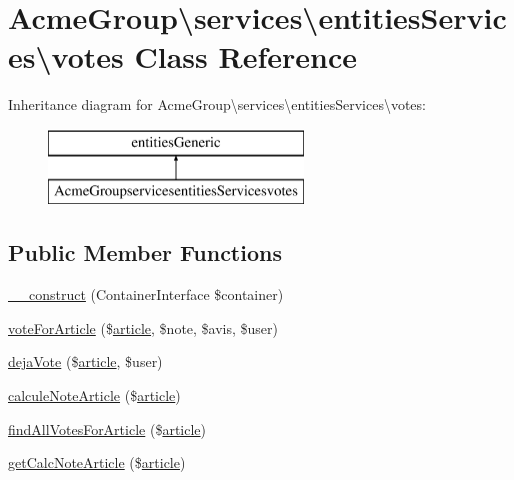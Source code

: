 \hypertarget{class_acme_group_1_1services_1_1entities_services_1_1votes}{\section{Acme\+Group\textbackslash{}services\textbackslash{}entities\+Services\textbackslash{}votes Class Reference}
\label{class_acme_group_1_1services_1_1entities_services_1_1votes}
}
Inheritance diagram for Acme\+Group\textbackslash{}services\textbackslash{}entities\+Services\textbackslash{}votes\+:\begin{figure}[H]
\begin{center}
\leavevmode
\includegraphics[height=2.000000cm]{class_acme_group_1_1services_1_1entities_services_1_1votes}
\end{center}
\end{figure}
\subsection*{Public Member Functions}
\begin{DoxyCompactItemize}
\item 
\hyperlink{class_acme_group_1_1services_1_1entities_services_1_1votes_af541f0aa42a9db3a5e1b8128765dedf6}{\+\_\+\+\_\+construct} (Container\+Interface \$container)
\item 
\hyperlink{class_acme_group_1_1services_1_1entities_services_1_1votes_a467e89e075a54283a7ab17bd38a63881}{vote\+For\+Article} (\$\hyperlink{class_acme_group_1_1_labo_bundle_1_1_entity_1_1article}{article}, \$note, \$avis, \$user)
\item 
\hyperlink{class_acme_group_1_1services_1_1entities_services_1_1votes_a23788787fd918ae002d89b3fcd9e23ea}{deja\+Vote} (\$\hyperlink{class_acme_group_1_1_labo_bundle_1_1_entity_1_1article}{article}, \$user)
\item 
\hyperlink{class_acme_group_1_1services_1_1entities_services_1_1votes_a9370140d10981eb894a3f081452eca7b}{calcule\+Note\+Article} (\$\hyperlink{class_acme_group_1_1_labo_bundle_1_1_entity_1_1article}{article})
\item 
\hyperlink{class_acme_group_1_1services_1_1entities_services_1_1votes_a6d9a6baf07a3957dc9a8aab8eaf02caa}{find\+All\+Votes\+For\+Article} (\$\hyperlink{class_acme_group_1_1_labo_bundle_1_1_entity_1_1article}{article})
\item 
\hyperlink{class_acme_group_1_1services_1_1entities_services_1_1votes_a2a327c39b975fd2d24eac79a6d7c7b12}{get\+Calc\+Note\+Article} (\$\hyperlink{class_acme_group_1_1_labo_bundle_1_1_entity_1_1article}{article})
\end{DoxyCompactItemize}
